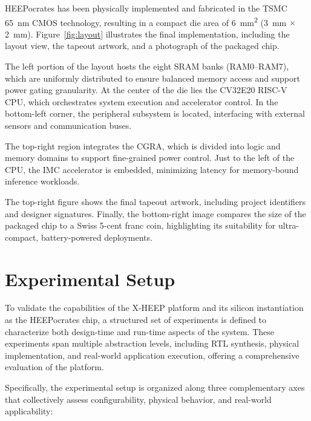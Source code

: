                 \mbox{HEEPocrates} has been physically implemented and fabricated in the \mbox{TSMC} \SI{65}{\nano\meter} CMOS technology, resulting in a compact die area of \SI{6}{\milli\meter\squared} (\SI{3}{\milli\meter} $\times$ \SI{2}{\milli\meter}). Figure~\ref{fig:layout} illustrates the final implementation, including the layout view, the tapeout artwork, and a photograph of the packaged chip.
                
                The left portion of the layout hosts the eight SRAM banks (RAM0–RAM7), which are uniformly distributed to ensure balanced memory access and support power gating granularity. At the center of the die lies the \textsc{CV32E20} RISC-V CPU, which orchestrates system execution and accelerator control. In the bottom-left corner, the peripheral subsystem is located, interfacing with external sensors and communication buses.
                
                The top-right region integrates the CGRA, which is divided into logic and memory domains to support fine-grained power control. Just to the left of the CPU, the IMC accelerator is embedded, minimizing latency for memory-bound inference workloads.
                
                The top-right figure shows the final tapeout artwork, including project identifiers and designer signatures. Finally, the bottom-right image compares the size of the packaged chip to a Swiss 5-cent franc coin, highlighting its suitability for ultra-compact, battery-powered deployments.

    \section{Experimental Setup}
    \label{sec:experimental_setup}
    
        To validate the capabilities of the \mbox{X-HEEP} platform and its silicon instantiation as the \mbox{HEEPocrates} chip, a structured set of experiments is defined to characterize both design-time and run-time aspects of the system. These experiments span multiple abstraction levels, including RTL synthesis, physical implementation, and real-world application execution, offering a comprehensive evaluation of the platform.
        
        Specifically, the experimental setup is organized along three complementary axes that collectively assess configurability, physical behavior, and real-world applicability:


